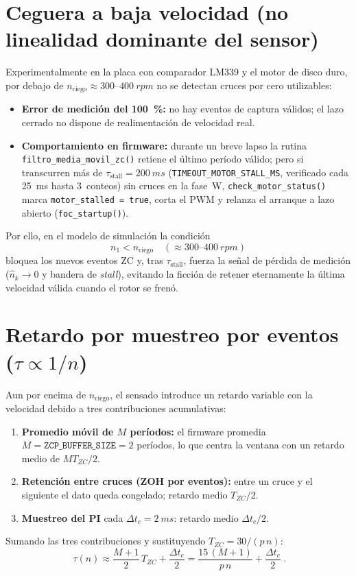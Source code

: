 \documentclass[11pt,a4paper,oneside]{report}
\theoremstyle{definition}
\theoremstyle{remark}
\begin{document}
\section{Ceguera a baja velocidad (no linealidad dominante del sensor)}
Experimentalmente en la placa con comparador LM339 y el motor de disco duro,
por debajo de $n_{\text{ciego}} \approx 300\text{--}\SI{400}{rpm}$ no se detectan
cruces por cero utilizables:
\begin{itemize}
  \item \textbf{Error de medición del \SI{100}{\percent}:} no hay eventos de
        captura válidos; el lazo cerrado no dispone de realimentación de
        velocidad real.
  \item \textbf{Comportamiento en firmware:} durante un breve lapso la rutina
        \texttt{filtro\_\allowbreak media\_\allowbreak movil\_\allowbreak zc()}
        retiene el último período válido; pero si transcurren más de
        $\tau_{\text{stall}} = \SI{200}{ms}$
        (\texttt{TIMEOUT\_\allowbreak MOTOR\_\allowbreak STALL\_\allowbreak MS},
        verificado cada \SI{25}{ms} hasta 3~conteos) sin cruces en la fase~W,
        \texttt{check\_\allowbreak motor\_\allowbreak status()} marca
        \texttt{motor\_stalled = true}, corta el PWM y relanza el arranque a
        lazo abierto (\texttt{foc\_startup()}).
\end{itemize}
Por ello, en el modelo de simulación la condición
\begin{equation}
  n_1 < n_{\text{ciego}} \quad (\approx 300\text{--}\SI{400}{rpm})
\end{equation}
bloquea los nuevos eventos ZC y, tras $\tau_{\text{stall}}$, fuerza la señal de
pérdida de medición ($\hat n_k \to 0$ y bandera de \emph{stall}), evitando la
ficción de retener eternamente la última velocidad válida cuando el rotor se
frenó.

\section{Retardo por muestreo por eventos (\texorpdfstring{$\tau \propto 1/n$}{tau proporcional a 1/n})}\label{sec:retardo}
Aun por encima de $n_{\text{ciego}}$, el sensado introduce un retardo variable
con la velocidad debido a tres contribuciones acumulativas:
\begin{enumerate}
  \item \textbf{Promedio móvil de $M$ períodos:} el firmware promedia
        $M=\texttt{ZCP\_BUFFER\_SIZE}=2$ períodos, lo que centra la ventana con
        un retardo medio de $M T_{ZC}/2$.
  \item \textbf{Retención entre cruces (ZOH por eventos):} entre un cruce y el
        siguiente el dato queda congelado; retardo medio $T_{ZC}/2$.
  \item \textbf{Muestreo del PI} cada $\Delta t_c = \SI{2}{ms}$: retardo medio
        $\Delta t_c/2$.
\end{enumerate}
Sumando las tres contribuciones y sustituyendo $T_{ZC}=30/(p\,n)$:
\begin{equation}
  \boxed{\;\tau(n) \approx \frac{M+1}{2}\,T_{ZC} + \frac{\Delta t_c}{2}
         = \frac{15\,(M+1)}{p\,n} + \frac{\Delta t_c}{2}\;.}
  \label{eq:retardo}
\end{equation}
\end{document}
